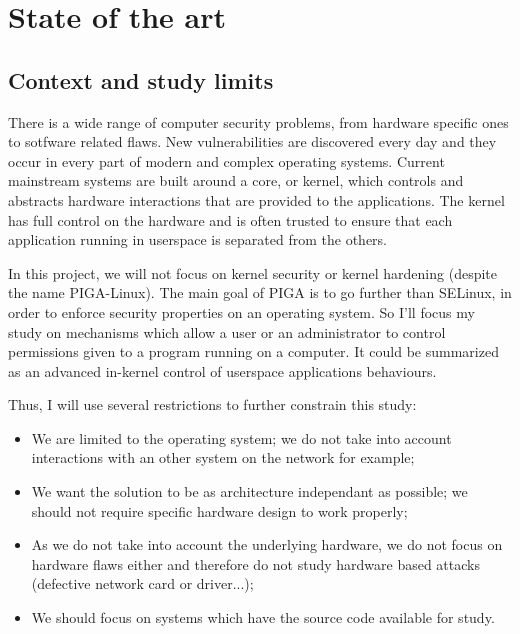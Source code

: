\documentclass[pdftex,a4paper,titlepage,11pt]{article}
\begin{document}

\newpage

\section{State of the art}

\subsection{Context and study limits}


There is a wide range of computer security problems, from hardware specific ones
to sotfware related flaws. New vulnerabilities are discovered every day and they
occur in every part of modern and complex operating systems. Current mainstream
systems are built around a core, or kernel, which controls and abstracts
hardware interactions that are provided to the applications. The kernel has full
control on the hardware and is often trusted to ensure that each application
running in userspace is separated from the others.

\bigskip

In this project, we will not focus on kernel security or kernel hardening
(despite the name PIGA-Linux). The main goal of PIGA is to go further than
SELinux, in order to enforce security properties on an operating system. So I'll
focus my study on mechanisms which allow a user or an administrator to control
permissions given to a program running on a computer. It could be summarized as
an advanced in-kernel control of userspace applications behaviours.

\bigskip

Thus, I will use several restrictions to further constrain this study:
\begin{itemize}
	\item We are limited to the operating system; we do not take into account
interactions with an other system on the network for example;
	\item We want the solution to be as architecture independant as possible; we
should not require specific hardware design to work properly;
	\item As we do not take into account the underlying hardware, we do not
focus on hardware flaws either and therefore do not study hardware based attacks
(defective network card or driver...);
	\item We should focus on systems which have the source code available for
study.
\end{itemize}
\end{document}
